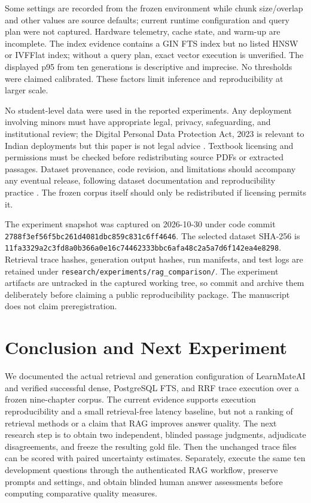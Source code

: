 \documentclass[conference]{IEEEtran}
\begin{document}
Some settings are recorded from the frozen environment while chunk size/overlap and other values are source defaults; current runtime configuration and query plan were not captured. Hardware telemetry, cache state, and warm-up are incomplete. The index evidence contains a GIN FTS index but no listed HNSW or IVFFlat index; without a query plan, exact vector execution is unverified. The displayed p95 from ten generations is descriptive and imprecise. No thresholds were claimed calibrated. These factors limit inference and reproducibility at larger scale.

No student-level data were used in the reported experiments. Any deployment involving minors must have appropriate legal, privacy, safeguarding, and institutional review; the Digital Personal Data Protection Act, 2023 is relevant to Indian deployments but this paper is not legal advice \cite{r77}. Textbook licensing and permissions must be checked before redistributing source PDFs or extracted passages. Dataset provenance, code revision, and limitations should accompany any eventual release, following dataset documentation and reproducibility practice \cite{r75,r76}. The frozen corpus itself should only be redistributed if licensing permits it.

The experiment snapshot was captured on 2026-10-30 under code commit \texttt{2788f3ef56f5bc261d4081dbc859c831c6ff4646}. The selected dataset SHA-256 is \texttt{11fa3329a2c3fd8a0b366a0e16c74462333bbc6afa48c2a5a7d6f142ea4e8298}. Retrieval trace hashes, generation output hashes, run manifests, and test logs are retained under \texttt{research/experiments/rag\_comparison/}. The experiment artifacts are untracked in the captured working tree, so commit and archive them deliberately before claiming a public reproducibility package. The manuscript does not claim preregistration.

\section{Conclusion and Next Experiment}
We documented the actual retrieval and generation configuration of LearnMateAI and verified successful dense, PostgreSQL FTS, and RRF trace execution over a frozen nine-chapter corpus. The current evidence supports execution reproducibility and a small retrieval-free latency baseline, but not a ranking of retrieval methods or a claim that RAG improves answer quality. The next research step is to obtain two independent, blinded passage judgments, adjudicate disagreements, and freeze the resulting gold file. Then the unchanged trace files can be scored with paired uncertainty estimates. Separately, execute the same ten development questions through the authenticated RAG workflow, preserve prompts and settings, and obtain blinded human answer assessments before computing comparative quality measures.
\end{document}
